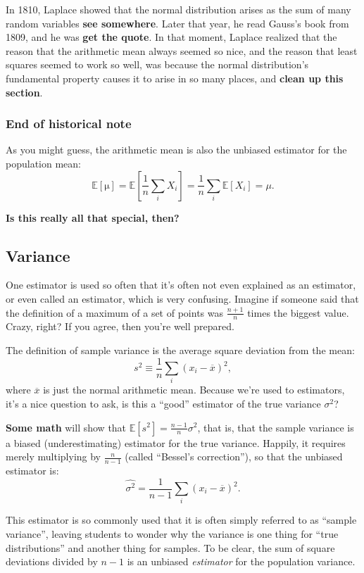 \documentclass{book}
\begin{document}
In 1810, Laplace showed that the normal distribution arises as the sum
of many random variables \textbf{see somewhere}. Later that year, he
read Gauss's book from 1809, and he was \textbf{get the quote}. In that
moment, Laplace realized that the reason that the arithmetic mean always
seemed so nice, and the reason that least squares seemed to work so
well, was because the normal distribution's fundamental property causes
it to arise in so many places, and \textbf{clean up this section}.

\subsubsection{End of historical note}\label{end-of-historical-note}

As you might guess, the arithmetic mean is also the unbiased estimator
for the population mean: \[
\mathbb{E}[\mathrm{\mu}] = \mathbb{E}\left[\frac{1}{n} \sum_i X_i \right] = \frac{1}{n} \sum_i \mathbb{E}[X_i] = \mu.
\]

\textbf{Is this really all that special, then?}

\subsection{Variance}\label{variance}

One estimator is used so often that it's often not even explained as an
estimator, or even called an estimator, which is very confusing. Imagine
if someone said that the definition of a maximum of a set of points was
\(\tfrac{n+1}{n}\) times the biggest value. Crazy, right? If you agree,
then you're well prepared.

The definition of sample variance is the average square deviation from
the mean: \[
s^2 \equiv \frac{1}{n} \sum_i (x_i - \overline{x})^2,
\] where \(\overline{x}\) is just the normal arithmetic mean. Because
we're used to estimators, it's a nice question to ask, is this a
``good'' estimator of the true variance \(\sigma^2\)?

\textbf{Some math} will show that
\(\mathbb{E}[s^2] = \tfrac{n-1}{n} \sigma^2\), that is, that the sample
variance is a biased (underestimating) estimator for the true variance.
Happily, it requires merely multiplying by \(\tfrac{n}{n-1}\) (called
``Bessel's correction''), so that the unbiased estimator is: \[
\hat{\sigma^2} = \frac{1}{n-1} \sum_i (x_i - \overline{x})^2.
\]

This estimator is so commonly used that it is often simply referred to
as ``sample variance'', leaving students to wonder why the variance is
one thing for ``true distributions'' and another thing for samples. To
be clear, the sum of square deviations divided by \(n-1\) is an unbiased
\emph{estimator} for the population variance.
\end{document}
